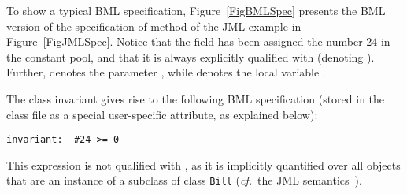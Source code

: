 To show a typical BML specification, Figure~\ref{FigBMLSpec} presents
the BML version of the specification of method 
of the JML example in Figure~\ref{FigJMLSpec}. Notice that the field
 has been assigned the number 24 in the constant
pool, and that it is always explicitly qualified with 
(denoting ). Further,  denotes the
parameter , while  denotes the local variable
.
 
The class invariant gives rise to the following BML specification
(stored in the class file as a special user-specific attribute, as
explained below):

\begin{verbatim}
invariant:  #24 >= 0
\end{verbatim}

This expression is not qualified with , as it is
implicitly quantified over all objects that are an instance of a
subclass of class \texttt{Bill} (\emph{cf.}\ the JML
semantics~\cite[\S 8.2]{JMLReferenceManual05}).


	



